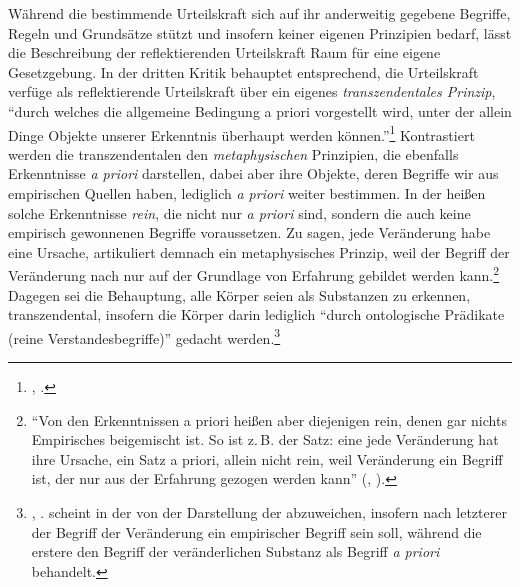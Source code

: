 \begin{nummerierung}
Während die bestimmende Urteilskraft sich auf ihr anderweitig gegebene Begriffe,
Regeln und Grundsätze stützt und insofern keiner eigenen Prinzipien bedarf, lässt die
Beschreibung der reflektierenden Urteilskraft Raum für eine eigene Gesetzgebung.
In der dritten Kritik behauptet  entsprechend, die
Urteilskraft verfüge als reflektierende Urteilskraft über ein eigenes
\emph{transzendentales Prinzip}, \enquote{durch welches die allgemeine
Bedingung a priori vorgestellt wird, unter der allein Dinge Objekte unserer
Erkenntnis überhaupt werden können.}\footnote{\cite[][B
xxix]{Kant:KritikderUrteilskraft2009}, \cite[][V:
181.15--17]{Kant:GesammelteWerke1900ff.}.} Kontrastiert werden die
transzendentalen den \emph{metaphysischen} Prinzipien, die ebenfalls
Erkenntnisse \emph{a priori} darstellen, dabei aber ihre Objekte, deren Begriffe
wir aus empirischen Quellen haben, lediglich \emph{a priori} weiter
bestimmen. In der  heißen solche Erkenntnisse
\emph{rein}, die nicht nur \emph{a priori} sind, sondern die auch keine
empirisch gewonnenen Begriffe voraussetzen. Zu sagen, jede Veränderung habe eine
Ursache, artikuliert demnach ein metaphysisches Prinzip, weil der Begriff der
Veränderung nach  nur auf der Grundlage von Erfahrung
gebildet werden kann.\footnote{\enquote{Von den Erkenntnissen a priori heißen
aber diejenigen rein, denen gar nichts Empirisches beigemischt ist. So ist z.\,B.
der Satz: eine jede Veränderung hat ihre Ursache, ein Satz a priori, allein
nicht rein, weil Veränderung ein Begriff ist, der nur aus der Erfahrung gezogen
werden kann} \mkbibparens{\cite[][B 3]{Kant:KritikderreinenVernunft2003},
\cite[][III: 28.23--27]{Kant:GesammelteWerke1900ff.}}.} Dagegen sei die
Behauptung, alle Körper seien als Substanzen zu erkennen, transzendental, insofern die Körper darin
lediglich \enquote{durch ontologische Prädikate (reine Verstandesbegriffe)} gedacht
werden.\footnote{\cite[Vgl.][B xxix]{Kant:KritikderUrteilskraft2009},
\cite[][V: 181.20--27]{Kant:GesammelteWerke1900ff.}. 
scheint in der  von der Darstellung der
 abzuweichen, insofern nach letzterer der
Begriff der Veränderung ein empirischer Begriff sein soll, während die erstere
den Begriff der veränderlichen Substanz als Begriff \emph{a priori} behandelt.}


\end{nummerierung}
